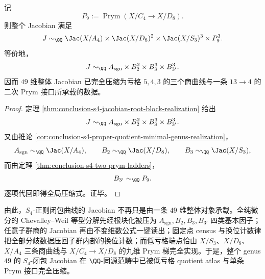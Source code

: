 \begin{theorem}\label{thm:conclusion-s4-global-jacobian-low-genus-compression}
记
\[
P_9:=\operatorname{Prym}(X/C_4\to X/D_8).
\]
则整个 Jacobian 满足
\[
J
\sim_{\QQ}
\Jac(X/A_4)\times
\Jac(X/D_8)^{2}\times
\Jac(X/S_3)^{3}\times
P_9^{3}.
\]
等价地，
\[
J\sim_{\QQ}
A_{\mathrm{sgn}}\times B_2^{2}\times B_3^{3}\times B_{3'}^{3}.
\]
因而 \(49\) 维整体 Jacobian 已完全压缩为亏格 \(5,4,3\) 的三个商曲线与一条 \(13\to4\) 的二次 Prym 接口所承载的数据。
\end{theorem}
\begin{proof}
定理 \ref{thm:conclusion-s4-jacobian-root-block-realization} 给出
\[
J\sim_{\QQ}
A_{\mathrm{sgn}}\times B_2^{2}\times B_3^{3}\times B_{3'}^{3}.
\]
又由推论 \ref{cor:conclusion-s4-proper-quotient-minimal-genus-realization}，
\[
A_{\mathrm{sgn}}\sim_{\QQ}\Jac(X/A_4),\qquad
B_2\sim_{\QQ}\Jac(X/D_8),\qquad
B_3\sim_{\QQ}\Jac(X/S_3),
\]
而由定理 \ref{thm:conclusion-s4-two-prym-ladders}，
\[
B_{3'}\sim_{\QQ}P_9.
\]
逐项代回即得全局压缩式。证毕。
\end{proof}

由此，\(S_4\)-正则闭包曲线的 Jacobian 不再只是由一条 \(49\) 维整体对象承载。全纯微分的 Chevalley--Weil 等型分解先经根块化被压为 \(A_{\mathrm{sgn}},B_2,B_3,B_{3'}\) 四类基本因子；任意子群商的 Jacobian 再由不变维数公式一键读出；固定点 census 与换位计数律把全部分歧数据压回子群内部的换位计数；而低亏格端点恰由 \(X/S_3\)、\(X/D_8\)、\(X/A_4\) 三条商曲线与 \(X/C_4\to X/D_8\) 的九维 Prym 梯完全实现。于是，整个 genus \(49\) 的 \(S_4\)-闭包 Jacobian 在 \(\QQ\)-同源范畴中已被低亏格 quotient atlas 与单条 Prym 接口完全压缩。

\endinput
